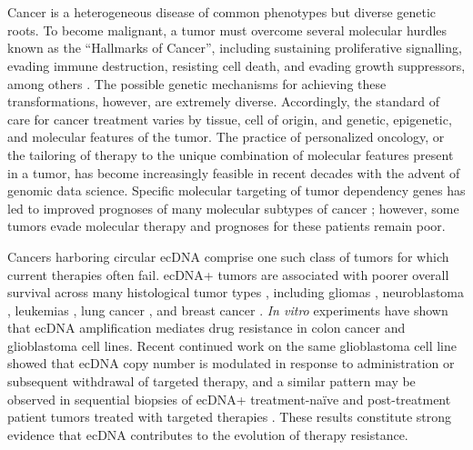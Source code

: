 \chapter*{\introtitle}
\label{sec:introduction}
\clearpage
\glsresetall

\par Cancer is a heterogeneous disease of common phenotypes but diverse genetic roots. To become malignant, a tumor must overcome several molecular hurdles known as the ``Hallmarks of Cancer'', including sustaining proliferative signalling, evading immune destruction, resisting cell death, and evading growth suppressors, among others \cite{Hallmarks}. The possible genetic mechanisms for achieving these transformations, however, are extremely diverse. Accordingly, the standard of care for cancer treatment varies by tissue, cell of origin, and genetic, epigenetic, and molecular features of the tumor. The practice of personalized oncology, or the tailoring of therapy to the unique combination of molecular features present in a tumor, has become increasingly feasible in recent decades with the advent of genomic data science. Specific molecular targeting of tumor dependency genes has led to improved prognoses of many molecular subtypes of cancer \cite{Vasan_2019}; however, some tumors evade molecular therapy and prognoses for these patients remain poor. 

\par Cancers harboring circular \gls{ecDNA} comprise one such class of tumors for which current therapies often fail. \gls{ecDNA+} tumors are associated with poorer overall survival across many histological tumor types \cite{Kim_2020}, including gliomas \cite{Nikolaev_2014}, neuroblastoma \cite{Koche_2020}, leukemias \cite{Storlazzi_2006}, lung cancer \cite{pongor_2023}, and breast cancer \cite{Vicario_2015}. \textit{In vitro} experiments have shown that \gls{ecDNA} amplification mediates drug resistance in colon cancer \cite{Morales_2009} and glioblastoma \cite{Nathanson_2014} cell lines. Recent continued work on the same glioblastoma cell line showed that \gls{ecDNA} copy number is modulated in response to administration or subsequent withdrawal of targeted therapy, and a similar pattern may be observed in sequential biopsies of \gls{ecDNA+} treatment-na{\"i}ve and post-treatment patient tumors treated with targeted therapies \cite{Lange_2021}. These results constitute strong evidence that \gls{ecDNA} contributes to the evolution of therapy resistance.

